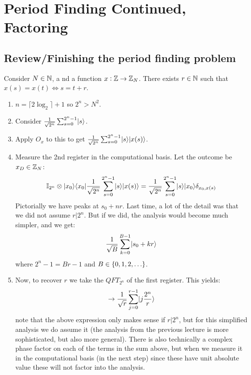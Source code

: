 \section{Period Finding Continued, Factoring}

\subsection*{Review/Finishing the period finding problem}
Consider $N \in \mathbb{N}$, a nd a function $x: \mathbb{Z} \to \mathbb{Z}_N$. There exists $r \in \mathbb{N}$ such that $x(s) = x(t) \iff s = t + r$. 

\begin{enumerate}
    \item $n = \lceil 2\log_2 \rceil + 1$ so $2^n > N^2$.
    \item Consider $\frac{1}{\sqrt{2^n}}\sum_{s=0}^{2^n-1}\lvert s \rangle$.
    \item Apply $O_x$ to this to get $\frac{1}{\sqrt{2^n}}\sum_{s=0}^{2^n-1}\lvert s \rangle\lvert x(s) \rangle$.
    \item Measure the 2nd register in the computational basis. Let the outcome be $x_D \in \mathbb{Z}_N$:
    \begin{equation}
        \mathbb{I}_{2^n} \otimes \lvert x_0 \rangle \langle x_0 \rvert \frac{1}{\sqrt{2^n}}\sum_{s=0}^{2^n-1}\lvert s \rangle\lvert x(s) \rangle = \frac{1}{\sqrt{2^n}}\sum_{s=0}^{2^n-1}\lvert s \rangle\lvert x_0 \rangle\delta_{x_0, x(s)}
    \end{equation}
    Pictorially we have peaks at $s_0 + nr$. Last time, a lot of the detail was that we did not assume $r \vert 2^n$. But if we did, the analysis would become much simpler, and we get:
    \begin{equation}
        \frac{1}{\sqrt{B}}\sum_{k=0}^{B-1}\lvert s_0 + kr \rangle
    \end{equation}
    where $2^n - 1 = Br - 1$ and $B \in \set{0, 1, 2, \ldots}$. 
    \item Now, to recover $r$ we take the $QFT_{2^n}$ of the first register. This yields:
    \begin{equation}
        \to \frac{1}{\sqrt{r}}\sum_{j=0}^{r-1}\lvert j\frac{2^n}{r} \rangle
    \end{equation}
    note that the above expression only makes sense if $r \vert 2^n$, but for this simplified analysis we do assume it (the analysis from the previous lecture is more sophisticated, but also more general). There is also technically a complex phase factor on each of the terms in the sum above, but when we measure it in the computational basis (in the next step) since these have unit absolute value these will not factor into the analysis.


\end{enumerate}
